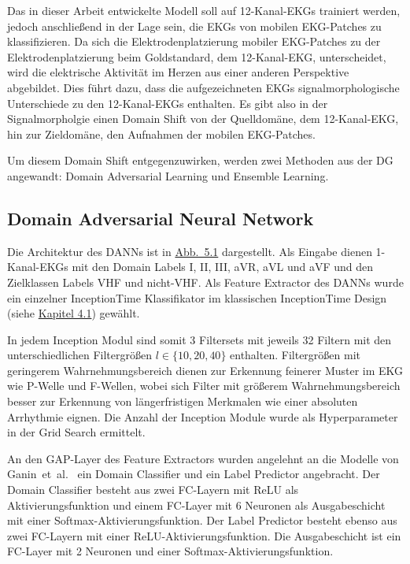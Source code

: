 

Das in dieser Arbeit entwickelte Modell soll auf 12-Kanal-\gls{EKG}s trainiert werden, jedoch anschließend in der Lage sein, die \gls{EKG}s von mobilen \gls{EKG}-Patches zu klassifizieren. Da sich die Elektrodenplatzierung mobiler \gls{EKG}-Patches zu der Elektrodenplatzierung beim Goldstandard, dem 12-Kanal-\gls{EKG}, unterscheidet, wird die elektrische Aktivität im Herzen aus einer anderen Perspektive abgebildet. Dies führt dazu, dass die aufgezeichneten \gls{EKG}s signalmorphologische Unterschiede zu den 12-Kanal-\gls{EKG}s enthalten. Es gibt also in der Signalmorpholgie einen Domain Shift von der Quelldomäne, dem 12-Kanal-\gls{EKG}, hin zur Zieldomäne, den Aufnahmen der mobilen \gls{EKG}-Patches.

Um diesem Domain Shift entgegenzuwirken, werden zwei Methoden aus der \gls{DG} angewandt: Domain Adversarial Learning und Ensemble Learning.

\subsection*{Domain Adversarial Neural Network}

Die Architektur des \gls{DANN}s ist in \hyperref[fig:DANN]{Abb.~5.1} dargestellt. Als Eingabe dienen 1-Kanal-\gls{EKG}s mit den Domain Labels I, II, III, aVR, aVL und aVF und den Zielklassen Labels \gls{VHF} und nicht-\gls{VHF}. Als Feature Extractor des \gls{DANN}s wurde ein einzelner InceptionTime Klassifikator im klassischen InceptionTime Design (siehe \hyperref[sec:InceptionTime]{Kapitel 4.1}) gewählt.

  In jedem Inception Modul sind somit 3 Filtersets mit jeweils 32 Filtern mit den unterschiedlichen Filtergrößen $l \in \{10, 20, 40\}$ enthalten. Filtergrößen mit geringerem Wahrnehmungsbereich dienen zur Erkennung feinerer Muster im \gls{EKG} wie P-Welle und F-Wellen, wobei sich Filter mit größerem Wahrnehmungsbereich besser zur Erkennung von längerfristigen Merkmalen wie einer absoluten Arrhythmie eignen. %
Die Anzahl der Inception Module wurde als Hyperparameter in der Grid Search ermittelt. 
 
An den \gls{GAP}-Layer des Feature Extractors wurden angelehnt an die Modelle von Ganin~et~al.~\cite{ganin_domain-adversarial_2016} ein Domain Classifier und ein Label Predictor angebracht. Der Domain Classifier besteht aus zwei \gls{FC}-Layern mit \gls{ReLU} als Aktivierungsfunktion und einem \gls{FC}-Layer mit 6 Neuronen als Ausgabeschicht mit einer Softmax-Aktivierungsfunktion. Der Label Predictor besteht ebenso aus zwei \gls{FC}-Layern mit einer \gls{ReLU}-Aktivierungsfunktion. Die Ausgabeschicht ist ein \gls{FC}-Layer mit 2 Neuronen und einer Softmax-Aktivierungsfunktion.

